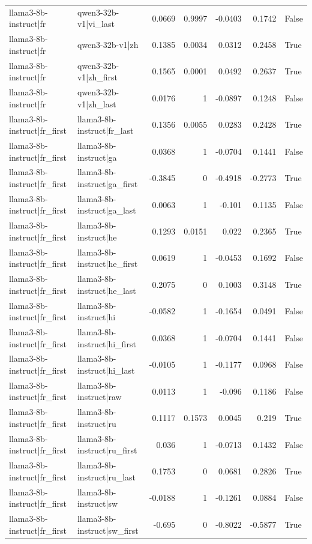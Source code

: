 \begin{table}
\begin{tabular}{l l r r r r l}
llama3-8b-instruct|fr & qwen3-32b-v1|vi_last & 0.0669 & 0.9997 & -0.0403 & 0.1742 & False \\
llama3-8b-instruct|fr & qwen3-32b-v1|zh & 0.1385 & 0.0034 & 0.0312 & 0.2458 & True \\
llama3-8b-instruct|fr & qwen3-32b-v1|zh_first & 0.1565 & 0.0001 & 0.0492 & 0.2637 & True \\
llama3-8b-instruct|fr & qwen3-32b-v1|zh_last & 0.0176 & 1 & -0.0897 & 0.1248 & False \\
llama3-8b-instruct|fr_first & llama3-8b-instruct|fr_last & 0.1356 & 0.0055 & 0.0283 & 0.2428 & True \\
llama3-8b-instruct|fr_first & llama3-8b-instruct|ga & 0.0368 & 1 & -0.0704 & 0.1441 & False \\
llama3-8b-instruct|fr_first & llama3-8b-instruct|ga_first & -0.3845 & 0 & -0.4918 & -0.2773 & True \\
llama3-8b-instruct|fr_first & llama3-8b-instruct|ga_last & 0.0063 & 1 & -0.101 & 0.1135 & False \\
llama3-8b-instruct|fr_first & llama3-8b-instruct|he & 0.1293 & 0.0151 & 0.022 & 0.2365 & True \\
llama3-8b-instruct|fr_first & llama3-8b-instruct|he_first & 0.0619 & 1 & -0.0453 & 0.1692 & False \\
llama3-8b-instruct|fr_first & llama3-8b-instruct|he_last & 0.2075 & 0 & 0.1003 & 0.3148 & True \\
llama3-8b-instruct|fr_first & llama3-8b-instruct|hi & -0.0582 & 1 & -0.1654 & 0.0491 & False \\
llama3-8b-instruct|fr_first & llama3-8b-instruct|hi_first & 0.0368 & 1 & -0.0704 & 0.1441 & False \\
llama3-8b-instruct|fr_first & llama3-8b-instruct|hi_last & -0.0105 & 1 & -0.1177 & 0.0968 & False \\
llama3-8b-instruct|fr_first & llama3-8b-instruct|raw & 0.0113 & 1 & -0.096 & 0.1186 & False \\
llama3-8b-instruct|fr_first & llama3-8b-instruct|ru & 0.1117 & 0.1573 & 0.0045 & 0.219 & True \\
llama3-8b-instruct|fr_first & llama3-8b-instruct|ru_first & 0.036 & 1 & -0.0713 & 0.1432 & False \\
llama3-8b-instruct|fr_first & llama3-8b-instruct|ru_last & 0.1753 & 0 & 0.0681 & 0.2826 & True \\
llama3-8b-instruct|fr_first & llama3-8b-instruct|sw & -0.0188 & 1 & -0.1261 & 0.0884 & False \\
llama3-8b-instruct|fr_first & llama3-8b-instruct|sw_first & -0.695 & 0 & -0.8022 & -0.5877 & True \\

\end{tabular}
\end{table}
